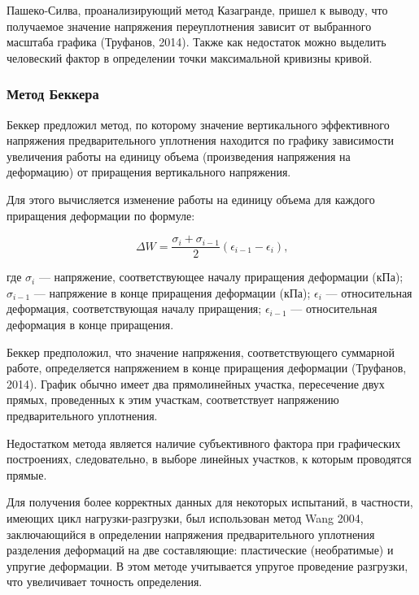 Пашеко-Силва, проанализирующий метод Казагранде, пришел к выводу, 
что получаемое значение напряжения переуплотнения зависит от выбранного
масштаба графика (Труфанов, 2014). Также как недостаток можно выделить человеский 
фактор в определении точки максимальной кривизны кривой.


\subsubsection{Метод Беккера}

Беккер предложил метод, по которому значение вертикального эффективного 
напряжения предварительного уплотнения находится по 
графику зависимости увеличения работы на единицу объема 
(произведения напряжения на деформацию) от приращения вертикального напряжения.

Для этого вычисляется изменение работы на единицу объема для каждого
приращения деформации по формуле:

\[
   \Delta W = \frac{\sigma_i + \sigma_{i - 1}}{2} (\epsilon_{i - 1} - \epsilon_i) \text{,}
\]

где $\sigma_i$ --- напряжение, соответствующее началу приращения деформации (кПа); 
$\sigma_{i-1}$ --- напряжение в конце приращения деформации (кПа);
$\epsilon_i$ --- относительная деформация, соответствующая началу приращения; 
$\epsilon_{i-1}$ --- относительная деформация в конце
приращения.

Беккер предположил, что значение напряжения, соответствующего суммарной 
работе, определяется напряжением в конце приращения деформации (Труфанов, 2014).
График обычно имеет два прямолинейных участка, пересечение 
двух прямых, проведенных к этим участкам, соответствует 
напряжению предварительного уплотнения. 

Недостатком метода является наличие субъективного фактора при
графических построениях, следовательно, в выборе линейных участков, 
к которым проводятся прямые.

Для получения более корректных данных для некоторых испытаний, 
в частности, имеющих цикл нагрузки-разгрузки, был использован 
метод Wang 2004, заключающийся в определении напряжения 
предварительного уплотнения разделения деформаций на две 
составляющие: пластические (необратимые) и упругие деформации.
В этом методе учитывается упругое проведение разгрузки, 
что увеличивает точность определения.

